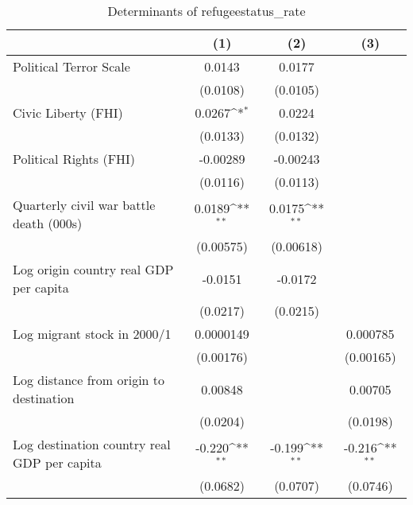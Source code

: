 \begin{table}[htbp]\centering
\def\sym#1{\ifmmode^{#1}\else\(^{#1}\)\fi}
\caption{Determinants of refugeestatus\_rate}
\begin{tabular}{l*{3}{c}}
\hline\hline
                    &\multicolumn{1}{c}{(1)}         &\multicolumn{1}{c}{(2)}         &\multicolumn{1}{c}{(3)}         \\
\hline
Political Terror Scale&      0.0143         &      0.0177         &                     \\
                    &    (0.0108)         &    (0.0105)         &                     \\
[1em]
Civic Liberty (FHI) &      0.0267\sym{*}  &      0.0224         &                     \\
                    &    (0.0133)         &    (0.0132)         &                     \\
[1em]
Political Rights (FHI)&    -0.00289         &    -0.00243         &                     \\
                    &    (0.0116)         &    (0.0113)         &                     \\
[1em]
Quarterly civil war battle death (000s)&      0.0189\sym{**} &      0.0175\sym{**} &                     \\
                    &   (0.00575)         &   (0.00618)         &                     \\
[1em]
Log origin country real GDP per capita&     -0.0151         &     -0.0172         &                     \\
                    &    (0.0217)         &    (0.0215)         &                     \\
[1em]
Log migrant stock in 2000/1&   0.0000149         &                     &    0.000785         \\
                    &   (0.00176)         &                     &   (0.00165)         \\
[1em]
Log distance from origin to destination&     0.00848         &                     &     0.00705         \\
                    &    (0.0204)         &                     &    (0.0198)         \\
[1em]
Log destination country real GDP per capita&      -0.220\sym{**} &      -0.199\sym{**} &      -0.216\sym{**} \\
                    &    (0.0682)         &    (0.0707)         &    (0.0746)         \\

\end{tabular}
\end{table}
